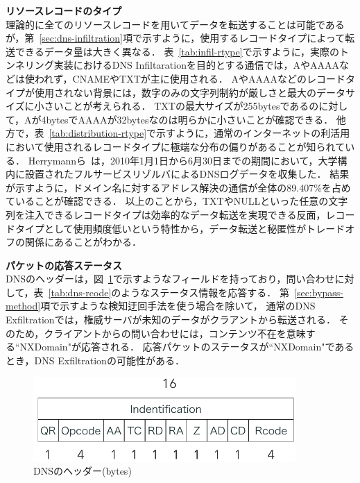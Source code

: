 \textbf{リソースレコードのタイプ}\\
理論的に全てのリソースレコードを用いてデータを転送することは可能であるが，第~\ref{sec:dns-infiltration}項で示すように，使用するレコードタイプによって転送できるデータ量は大きく異なる．
表~\ref{tab:infil-rtype}で示すように，実際のトンネリング実装におけるDNS Infiltarationを目的とする通信では，AやAAAAなどは使われず，CNAMEやTXTが主に使用される．
AやAAAAなどのレコードタイプが使用されない背景には，数字のみの文字列制約が厳しさと最大のデータサイズに小さいことが考えられる．
TXTの最大サイズが255bytesであるのに対して，Aが4bytesでAAAAが32bytesなのは明らかに小さいことが確認できる．
他方で，表~\ref{tab:distribution-rtype}で示すように，通常のインターネットの利活用において使用されるレコードタイプに極端な分布の偏りがあることが知られている．
Herrymannら~\cite{Herrymann}は，2010年1月1日から6月30日までの期間において，大学構内に設置されたフルサービスリゾルバによるDNSログデータを収集した．
結果が示すように，ドメイン名に対するアドレス解決の通信が全体の89.407\%を占めていることが確認できる．
以上のことから，TXTやNULLといった任意の文字列を注入できるレコードタイプは効率的なデータ転送を実現できる反面，レコードタイプとして使用頻度低いという特性から，データ転送と秘匿性がトレードオフの関係にあることがわかる．\newline


%
%
\textbf{パケットの応答ステータス}\\
DNSのヘッダーは，図~\ref{fig:dns-header}で示すようなフィールドを持っており，問い合わせに対して，表~\ref{tab:dns-rcode}のようなステータス情報を応答する．
第~\ref{sec:bypass-method}項で示すような検知迂回手法を使う場合を除いて，
通常のDNS Exfiltrationでは，権威サーバが未知のデータがクラアントから転送される．
そのため，クライアントからの問い合わせには，コンテンツ不在を意味する``NXDomain"が応答される．
応答パケットのステータスが``NXDomain"であるとき，DNS Exfiltrationの可能性がある．
\begin{figure}[h]
 \centering
 \includegraphics[width=10.0cm]{figure/dns-header.png}
 \caption{DNSのヘッダー(bytes)}
 \label{fig:dns-header}
\end{figure}

